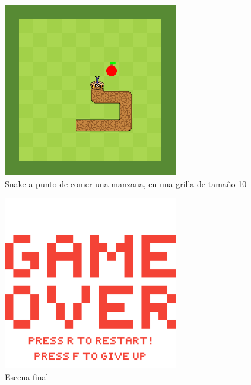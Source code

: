 \begin{figure}[H]
	\includegraphics[width=3in]{snake.png}
	\caption{Snake a punto de comer una manzana, en una grilla de tamaño 10}
	\label{fig:snake}
\end{figure}

\begin{figure}[H]
	\includegraphics[width=3in]{gameover.png}
	\caption{Escena final}
	\label{fig:gameover}
\end{figure}
